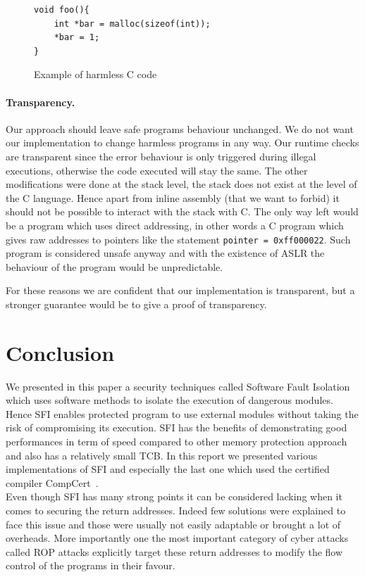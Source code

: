 \documentclass[11pt]{sdm}
\begin{document}
\begin{figure}[!ht]
\begin{lstlisting}
void foo(){
	int *bar = malloc(sizeof(int));
	*bar = 1;
}
\end{lstlisting}
\centering
\caption{Example of harmless C code }
\label{harmless}
\end{figure}

\paragraph{Transparency.}
\label{par:Transparency}
Our approach should leave safe programs behaviour unchanged. We do not want our implementation to change harmless programs in any way. Our runtime checks are transparent since the error behaviour is only triggered during illegal executions, otherwise the code executed will stay the same. The other modifications were done at the stack level, the stack does not exist at the level of the C language.
Hence apart from inline assembly (that we want to forbid) it should not be possible to interact with the stack with C. The only way left would be a program which uses direct addressing, in other words a C program which gives raw addresses to pointers like the statement \texttt{pointer = 0xff000022}.
Such program is considered unsafe anyway and with the existence of ASLR the behaviour of the program would be unpredictable.

For these reasons we are confident that our implementation is transparent, but a stronger guarantee would be to give a proof of transparency.

\newpage
\section{Conclusion}
\label{sec:Conclusion}
We presented in this paper a security techniques called Software Fault Isolation which uses software methods to isolate the execution of dangerous modules. Hence SFI enables protected program to use external modules without taking the risk of compromising its execution. SFI has the benefits of demonstrating good performances in term of speed compared to other memory protection approach and also has a relatively small TCB. In this report we presented various implementations of SFI and especially the last one which used the certified compiler CompCert~\cite{Kroll:2014:PSF:2708449.2708686}. \\
Even though SFI has many strong points it can be considered lacking when it comes to securing the return addresses. Indeed few solutions were explained to face this issue and those were usually not easily adaptable or brought a lot of overheads. More importantly one the most important category of cyber attacks called ROP attacks explicitly target these return addresses to modify the flow control of the programs in their favour.
\end{document}
